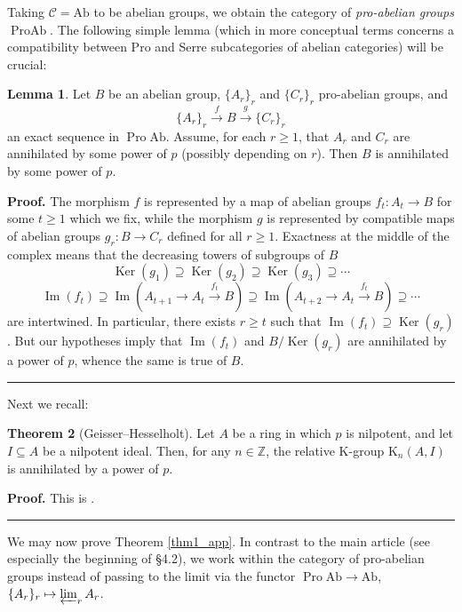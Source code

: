 \documentclass[reqno,11pt,letterpaper]{amsart}
\theoremstyle{plain}
\numberwithin{equation}{subsection}
\newtheorem{theorem}[equation]{Theorem}
\newtheorem{lemma}[equation]{Lemma}
\theoremstyle{remark}
\theoremstyle{plain}
\theoremstyle{definition}\newtheorem*{notation}{Notation}
\newcommand{\cal}{\mathcal}
\newcommand{\bb}{\mathbb}
\newcommand{\op}{\operatorname}
\newcommand{\To}{\longrightarrow}
\newcommand{\xto}{\xrightarrow}
\renewcommand{\cal}{\mathcal}
\newtheorem{theorem}{Theorem}
\newtheorem{lemma}[theorem]{Lemma}
\newenvironment{proof}[1][Proof]{\noindent\textbf{#1.} }{\ \rule{0.5em}{0.5em}}
\newcommand{\RK}{\mathrm{K}}
\begin{document}
Taking $\cal C=\textrm{Ab}$ to be abelian groups, we obtain the category of {\em pro-abelian groups} $\op{Pro}\textrm{Ab}$. The following simple lemma (which in more conceptual terms concerns a compatibility between Pro and Serre subcategories of abelian categories) will be crucial:

\begin{lemma}\label{lemma_app}
Let $B$ be an abelian group, $\{A_r\}_r$ and $\{C_r\}_r$ pro-abelian groups, and \[\{A_r\}_r\stackrel f\To B\stackrel g\To \{C_r\}_r\] an exact sequence in $\op{Pro}\mathrm{Ab}$. Assume, for each $r\ge1$, that $A_r$ and $C_r$ are annihilated by some power of $p$ (possibly depending on $r$). Then $B$ is annihilated by some power of $p$.
\end{lemma}
\begin{proof}
The morphism $f$ is represented by a map of abelian groups $f_t:A_t\to B$ for some $t\ge 1$ which we fix, while the morphism $g$ is represented by compatible maps of abelian groups $g_r:B\to C_r$ defined for all $r\ge1$. Exactness at the middle of the complex means that the decreasing towers of subgroups of $B$
\[\op{Ker}(g_1)\supseteq \op{Ker}(g_2)\supseteq\op{Ker}(g_3)\supseteq\cdots\]
\[\op{Im}(f_t)\supseteq \op{Im}(A_{t+1}\to A_t\xto{f_t} B)\supseteq \op{Im}(A_{t+2}\to A_t\xto{f_t} B)\supseteq\cdots\]
are intertwined. In particular, there exists $r\ge t$ such that $\op{Im}(f_t) \supseteq \op{Ker}(g_r)$. But our hypotheses imply that $\op{Im}(f_t)$ and $B/\op{Ker}(g_r)$ are annihilated by a power of $p$, whence the same is true of $B$.
\end{proof}

Next we recall:

\begin{theorem}[Geisser--Hesselholt]\label{GH_app}
Let $A$ be a ring in which $p$ is nilpotent, and let $I\subseteq A$ be a nilpotent ideal. Then, for any $n\in\bb Z$, the relative $\RK$-group $\RK_n(A,I)$ is annihilated by a power of $p$.
\end{theorem}
\begin{proof}
This is \cite[Thm.~A]{GH2}.
\end{proof}

We may now prove Theorem \ref{thm1_app}. In contrast to the main article (see especially the beginning of \S 4.2), we work within the category of pro-abelian groups instead of passing to the limit via the functor $\op{Pro}\mathrm{Ab}\to\mathrm{Ab}$, $\{A_r\}_r\mapsto\varprojlim_r A_r$.
\end{document}
